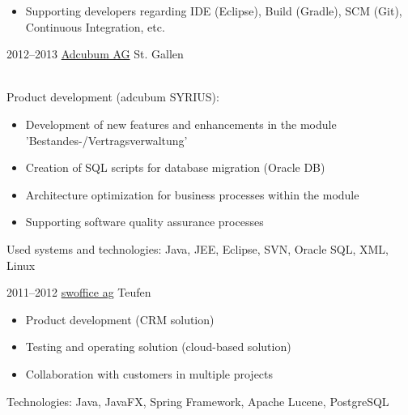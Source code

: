 \documentclass[]{cv-style}
\begin{document}
\begin{entrylist}
{\begin{itemize}
    \item Supporting developers regarding IDE (Eclipse), Build (Gradle), SCM (Git), Continuous Integration, etc.
  \end{itemize}}
\entry
  {2012--2013}
  {\href{https://www.adcubum.com}{Adcubum AG}}
  {St. Gallen}
  {\\
  Product development (adcubum SYRIUS):
  \begin{itemize}
    \item Development of new features and enhancements in the module \\'Bestandes-/Vertragsverwaltung'
    \item Creation of SQL scripts for database migration (Oracle DB)
    \item Architecture optimization for business processes within the module
    \item Supporting software quality assurance processes
  \end{itemize}
  Used systems and technologies: Java, JEE, Eclipse, SVN, Oracle SQL, XML, Linux}
\entry
  {2011--2012}
  {\href{https://www.swoffice.ch/}{swoffice ag}}
  {Teufen}
  {
  \begin{itemize}
  	\item Product development (CRM solution)
  	\item Testing and operating solution (cloud-based solution)
  	\item Collaboration with customers in multiple projects
  \end{itemize}
  Technologies: Java, JavaFX, Spring Framework, Apache Lucene, PostgreSQL}
\end{entrylist}
\end{document}
